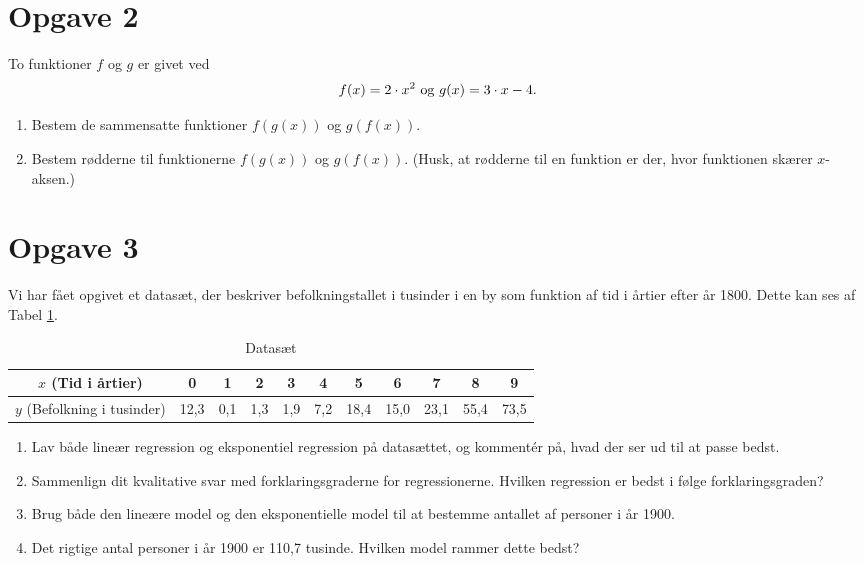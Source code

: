\section*{Opgave 2}
To funktioner $f$ og $g$ er givet ved 
\begin{align*}
f(x) = 2\cdot x^2 \textnormal{ og } g(x) = 3\cdot x - 4.
\end{align*}
\begin{enumerate}[label=\roman*)]
\item Bestem de sammensatte funktioner $f(g(x))$ og $g(f(x))$. 
\item Bestem rødderne til funktionerne $f(g(x))$ og $g(f(x))$. (Husk, at rødderne til en funktion er der, hvor funktionen skærer $x$-aksen.)
\end{enumerate}
\section*{Opgave 3}
Vi har fået opgivet et datasæt, der beskriver befolkningstallet i tusinder i en by som funktion af tid i årtier efter år 1800. Dette kan ses af Tabel \ref{tab:datatab}.
\begin{table}[H]
\centering
\begin{tabular}{c|c|c|c|c|c|c|c|c|c|c}
$x$ (Tid i årtier) & 0&1&2&3&4&5&6&7&8&9 \\ \hline
$y$ (Befolkning i tusinder)& 12,3 & 0,1 & 1,3 & 1,9 & 7,2 & 18,4 & 15,0 & 23,1 & 55,4 & 73,5
\end{tabular}
\caption{Datasæt}
\label{tab:datatab}
\end{table}
\begin{enumerate}[label=\roman*)]
\item Lav både lineær regression og eksponentiel regression på datasættet, og kommentér på, hvad der ser ud til at passe bedst.
\item Sammenlign dit kvalitative svar med forklaringsgraderne for regressionerne. Hvilken regression er bedst i følge forklaringsgraden?
\item Brug både den lineære model og den eksponentielle model til at bestemme antallet af personer i år 1900.
\item Det rigtige antal personer i år 1900 er 110,7 tusinde. Hvilken model rammer dette bedst?
\end{enumerate}

